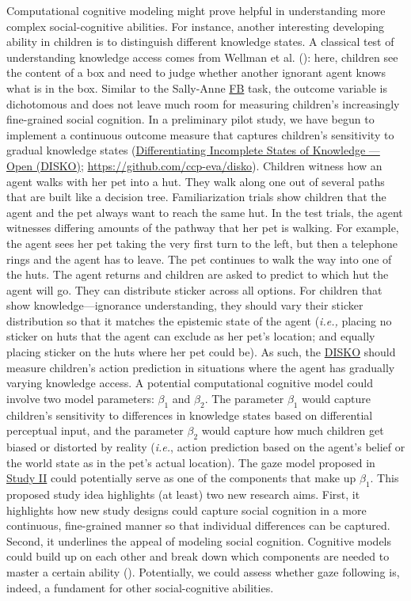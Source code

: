\documentclass[
]{scrbook}
\begin{document}
Computational cognitive modeling might prove helpful in understanding more complex social-cognitive abilities. For instance, another interesting developing ability in children is to distinguish different knowledge states. A classical test of understanding knowledge access comes from Wellman et al. (): here, children see the content of a box and need to judge whether another ignorant agent knows what is in the box. Similar to the Sally-Anne \hyperref[acronyms_FB]{FB} task, the outcome variable is dichotomous and does not leave much room for measuring children's increasingly fine-grained social cognition. In a preliminary pilot study, we have begun to implement a continuous outcome measure that captures children's sensitivity to gradual knowledge states (\hyperref[acronyms_DISKO]{Differentiating Incomplete States of Knowledge --- Open (DISKO)}; \mbox{\url{https://github.com/ccp-eva/disko}}). Children witness how an agent walks with her pet into a hut. They walk along one out of several paths that are built like a decision tree. Familiarization trials show children that the agent and the pet always want to reach the same hut. In the test trials, the agent witnesses differing amounts of the pathway that her pet is walking. For example, the agent sees her pet taking the very first turn to the left, but then a telephone rings and the agent has to leave. The pet continues to walk the way into one of the huts. The agent returns and children are asked to predict to which hut the agent will go. They can distribute sticker across all options. For children that show knowledge---ignorance understanding, they should vary their sticker distribution so that it matches the epistemic state of the agent (\emph{i.e.,} placing no sticker on huts that the agent can exclude as her pet's location; and equally placing sticker on the huts where her pet could be). As such, the \hyperref[acronyms_DISKO]{DISKO} should measure children's action prediction in situations where the agent has gradually varying knowledge access. A potential computational cognitive model could involve two model parameters: \(\beta_1\) and \(\beta_2\). The parameter \(\beta_1\) would capture children's sensitivity to differences in knowledge states based on differential perceptual input, and the parameter \(\beta_2\) would capture how much children get biased or distorted by reality (\emph{i.e.}, action prediction based on the agent's belief or the world state as in the pet's actual location). The gaze model proposed in \hyperref[studyII]{Study II} could potentially serve as one of the components that make up \(\beta_1\). This proposed study idea highlights (at least) two new research aims. First, it highlights how new study designs could capture social cognition in a more continuous, fine-grained manner so that individual differences can be captured. Second, it underlines the appeal of modeling social cognition. Cognitive models could build up on each other and break down which components are needed to master a certain ability (). Potentially, we could assess whether gaze following is, indeed, a fundament for other social-cognitive abilities.
\end{document}
